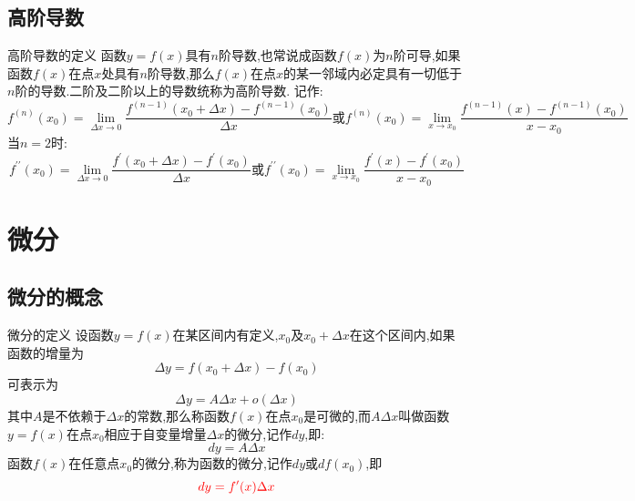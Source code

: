 \documentclass[8pt a4paper, oneside, UTF8]{ctexbook}  %
\begin{document}
\begin{sloppypar}
    \subsection{高阶导数}
    \begin{defn}{高阶导数的定义}{}
        函数$y=f(x)$具有$n$阶导数,也常说成函数$f(x)$为$n$阶可导,如果函数$f(x)$在点$x$处具有$n$阶导数,那么$f(x)$在点$x$的某一邻域内必定具有一切低于$n$阶的导数.二阶及二阶以上的导数统称为高阶导数.
        记作:
        $$
        f^{(n)}(x_0)=\lim_{\Delta x\to0}\dfrac{f^{(n-1)}(x_0+\Delta x)-f^{(n-1)}(x_0)}{\Delta x}\text{或}f^{(n)}(x_0)=\lim_{x\to x_0}\dfrac{f^{(n-1)}(x)-f^{(n-1)}(x_0)}{x-x_0}
        $$
        当$n=2$时:
        $$
        f^{\prime\prime}(x_0)=\lim_{\Delta x\to0}\dfrac{f^{\prime}(x_0+\Delta x)-f^{\prime}(x_0)}{\Delta x}\text{或}f^{\prime\prime}(x_0)=\lim_{x\to x_0}\dfrac{f^{\prime}(x)-f^{\prime}(x_0)}{x-x_0}
        $$
    \end{defn}
    \section{微分}
    \subsection{微分的概念}
    \begin{defn}{微分的定义}{}
        设函数$y=f(x)$在某区间内有定义,$x_0$及$x_0+\Delta x$在这个区间内,如果函数的增量为
        $$
            \Delta y=f(x_{0}+\Delta x)-f(x_{0})
        $$
        可表示为
        $$
            \Delta y=A\Delta x+o(\Delta x)
        $$
        其中$A$是不依赖于$\Delta x$的常数,那么称函数$f(x)$在点$x_0$是可微的,而$A\Delta x$叫做函数$y=f(x)$在点$x_0$相应于自变量增量$\Delta x$​的微分,记作$dy$,即:
        $$
            dy=A\Delta x
        $$
        函数$f(x)$在任意点$x_0$的微分,称为函数的微分,记作$dy$或$df(x_0)$,即
        $$
            \textcolor{red}{dy=f^{\prime}(x)\Delta x}
        $$
    \end{defn}

\end{sloppypar}
\end{document}
